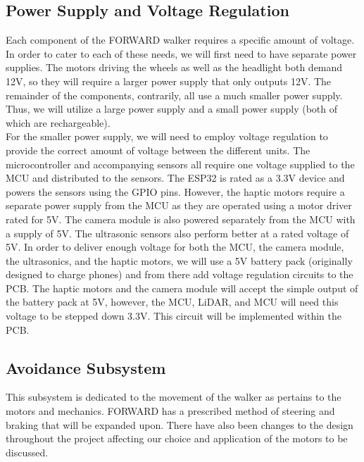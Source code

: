 \subsection{Power Supply and Voltage Regulation}
\noindent Each component of the FORWARD walker requires a specific amount of voltage. In order to cater to each of these needs, we will first need to have separate power supplies. The motors driving the wheels as well as the headlight both demand 12V, so they will require a larger power supply that only outputs 12V. The remainder of the components, contrarily, all use a much smaller power supply. Thus, we will utilize a large power supply and a small power supply (both of which are rechargeable).\\

\noindent For the smaller power supply, we will need to employ voltage regulation to provide the correct amount of voltage between the different units. The microcontroller and accompanying sensors all require one voltage supplied to the MCU and distributed to the sensors. The ESP32 is rated as a 3.3V device\cite{sparkfun12024} and powers the sensors using the GPIO pins. However, the haptic motors require a separate power supply from the MCU as they are operated using a motor driver rated for 5V. The camera module is also powered separately from the MCU with a supply of 5V. The ultrasonic sensors also perform better at a rated voltage of 5V. In order to deliver enough voltage for both the MCU, the camera module, the ultrasonics, and the haptic motors, we will use a 5V battery pack (originally designed to charge phones) and from there add voltage regulation circuits to the PCB. The haptic motors and the camera module will accept the simple output of the battery pack at 5V, however, the MCU, LiDAR, and MCU will need this voltage to be stepped down 3.3V. This circuit will be implemented within the PCB.

\subsection{Avoidance Subsystem}
\noindent This subsystem is dedicated to the movement of the walker as pertains to the motors and mechanics. FORWARD has a prescribed method of steering and braking that will be expanded upon. There have also been changes to the design throughout the project affecting our choice and application of the motors to be discussed.

